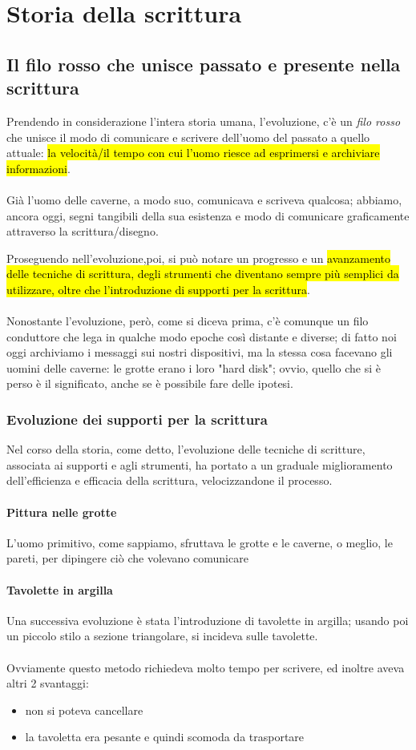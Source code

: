 \chapter{Storia della scrittura}
\section{Il filo rosso che unisce passato e presente nella scrittura}
Prendendo in considerazione l'intera storia umana, l'evoluzione, c'è un \textit{filo rosso} che unisce il modo di comunicare e scrivere dell'uomo del passato a quello attuale: \hl{la velocità/il tempo con cui l'uomo riesce ad esprimersi e archiviare informazioni}.
\\\\
Già l'uomo delle caverne, a modo suo, comunicava e scriveva qualcosa; abbiamo, ancora oggi, segni tangibili della sua esistenza e modo di comunicare graficamente attraverso la scrittura/disegno. 

Proseguendo nell'evoluzione,poi,  si può notare un progresso e un \hl{avanzamento delle tecniche di scrittura, degli strumenti che diventano sempre più semplici da utilizzare, oltre che l'introduzione di supporti per la scrittura}.
\\\\
Nonostante l'evoluzione, però, come si diceva prima, c'è comunque un filo conduttore che lega in qualche modo epoche così distante e diverse; di fatto noi oggi archiviamo i messaggi sui nostri dispositivi, ma la stessa cosa facevano gli uomini delle caverne: le grotte erano i loro "hard disk"; ovvio, quello che si è perso è il significato, anche se è possibile fare delle ipotesi.
\subsection{Evoluzione dei supporti per la scrittura}
Nel corso della storia, come detto, l'evoluzione delle tecniche di scritture, associata ai supporti e agli strumenti, ha portato a un graduale miglioramento dell'efficienza e efficacia della scrittura, velocizzandone il processo.
    \subsubsection{Pittura nelle grotte}
    L'uomo primitivo, come sappiamo, sfruttava le grotte e le caverne, o meglio, le pareti, per dipingere ciò che volevano comunicare
    \subsubsection{Tavolette in argilla}
    Una successiva evoluzione è stata l'introduzione di tavolette in argilla; usando poi un piccolo stilo a sezione triangolare, si incideva sulle tavolette.
    \\\\Ovviamente questo metodo richiedeva molto tempo per scrivere, ed inoltre aveva altri 2 svantaggi:
    \begin{itemize}
        \item non si poteva cancellare
        \item la tavoletta era pesante e quindi scomoda da trasportare
    \end{itemize}
